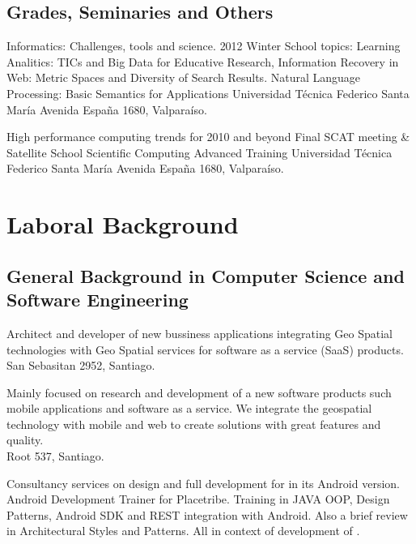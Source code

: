 \documentclass[11pt,letterpaper,roman]{moderncv}
\begin{document}
\subsection{Grades, Seminaries and Others}

	{Informatics: Challenges, tools and science.}
	{2012 Winter School}
	{topics: Learning Analitics: TICs and Big Data for Educative Research, Information Recovery in Web: Metric Spaces and Diversity of Search Results. Natural Language Processing: Basic Semantics for Applications }
	{Universidad T\'ecnica Federico Santa Mar\'ia}
	{Avenida España 1680, Valpara\'iso.}
	
	
	{High performance computing trends for 2010 and beyond}
	{Final SCAT meeting \& Satellite School}
	{Scientific Computing Advanced Training}
	{Universidad T\'ecnica Federico Santa Mar\'ia}
	{Avenida España 1680, Valpara\'iso.}


\section{Laboral Background}

\subsection{General Background in Computer Science and Software Engineering}


	 {\se} {\mapcity} {\stgo} {}
	{Architect and developer of new bussiness applications integrating Geo Spatial technologies with Geo Spatial services for software as a service (SaaS) products.
	\\ San Sebasitan 2952, Santiago.
	} 

	 {\cf} {\ingennia} {\stgo} {}
	{Mainly focused on research and development of a new software products
	such mobile applications and software as a service. We integrate the geospatial
	technology with mobile and web to create solutions with great features and
	quality.
	\\ Root 537, Santiago.}

	 {\scd} {\paonde} {\stgo} {}
	{Consultancy services on design and full development for \paondeapp 
	in its Android version.
	}
	 {\tchr} {\placetribe} {\stgo} {}
	{Android Development Trainer for Placetribe. Training in JAVA
	OOP, Design Patterns, Android SDK and REST integration with Android. Also a
	brief review in Architectural Styles and Patterns. All in context of development
	of \placetribeapp.
	}
\end{document}
